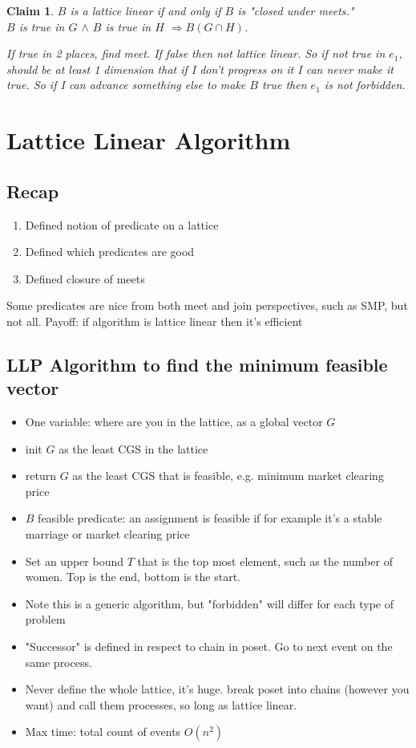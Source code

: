 \documentclass[twoside]{article}
\newtheorem{claim}[theorem]{Claim}
\begin{document}
\begin{claim}
$B$ is a lattice linear if and only if $B$ is "closed under meets."\\
$B$ is true in $G$ $\land$ $B$ is true in $H$ $\Rightarrow B(G \cap H)$.

If true in 2 places, find meet. If false then not lattice linear. So if not true in $e_1$, should be at least 1 dimension that if I don't progress on it I can never make it true. So if I can advance something else to make $B$ true then $e_1$ is not forbidden.

\end{claim}


\section{Lattice Linear Algorithm}

\subsection{Recap}
\begin{enumerate}
\item Defined notion of predicate on a lattice
\item Defined which predicates are good
\item Defined closure of meets
\end{enumerate}
Some predicates are nice from both meet and join perspectives, such as SMP, but not all. 
Payoff: if algorithm is lattice linear then it's efficient

\subsection{LLP Algorithm to find the minimum feasible vector}

\begin{itemize}
    \item One variable: where are you in the lattice, as a global vector $G$
    \item init $G$ as the least CGS in the lattice
    \item return $G$ as the least CGS that is feasible, e.g. minimum market clearing price
    \item $B$ feasible predicate: an assignment is feasible if for example it's a stable marriage or market clearing price
    \item Set an upper bound $T$ that is the top most element, such as the number of women. Top is the end, bottom is the start.
    \item Note this is a generic algorithm, but "forbidden" will differ for each type of problem
    \item "Successor" is defined in respect to chain in poset. Go to next event on the same process. 
    \item Never define the whole lattice, it's huge. break poset into chains (however you want) and call them processes, so long as lattice linear.
    \item Max time: total count of events $O(n^2)$
\end{itemize}
\end{document}

